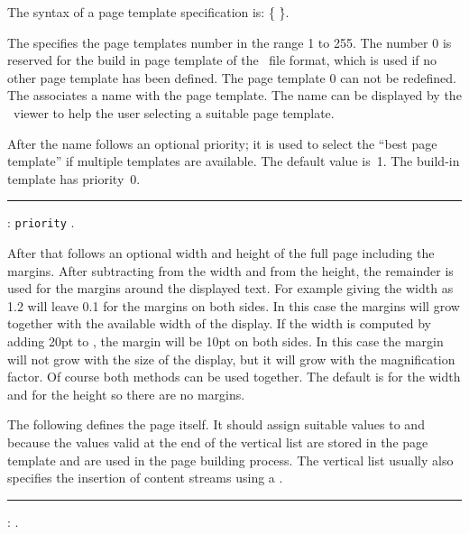 The syntax of a page template specification is:
\medskip
\prim{}
 \opt{\.{=}}  
  
\.{\{} \.{\}}.
\medskip

The  specifies the page templates number in the range 1
to 255.  The number 0 is reserved for the build in page template of
the \HINT\ file format, which is used if no other page template has
been defined. The page template 0 can not be redefined.
The  associates a name with the page template.  The name can
be displayed by the \HINT\ viewer to help the user selecting a
suitable page template.

After the name follows an optional priority; it is used to select the
``best page template'' if multiple templates are available. The
default value is~1. The build-in template has priority~0.

\medskip
\rule{}: {\tt priority} .
\medskip


After that follows an optional width and height of the full page
including the margins.  After subtracting  from the width
and  from the height, the remainder is used for the margins
around the displayed text.  For example giving the width as
1.2 will leave 0.1 for the margins on both sides.
In this case the margins will grow together with the available width
of the display.  If the width is computed by adding 20pt
to , the margin will be 10pt on both sides.  In this case
the margin will not grow with the size of the display, but it will
grow with the magnification factor.  Of course both methods can be
used together.  The default is  for the width and 
for the height so there are no margins.

The following  defines the page itself. It should assign suitable values
to  and  because the values valid at the end of the vertical list
are stored in the page template and are used in the page building process. 
The vertical list usually also specifies the insertion of content streams
using a .

\medskip
\rule{}:
   .
\medskip

